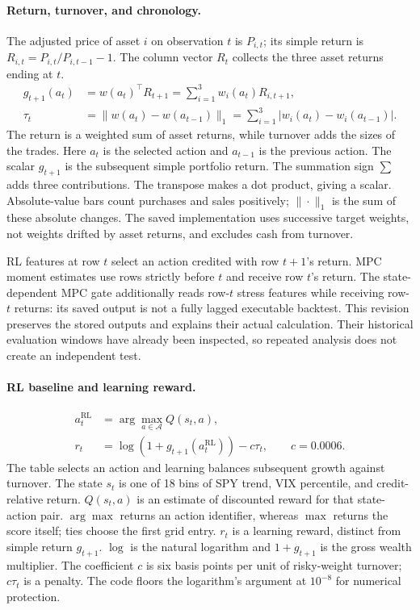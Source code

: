 \paragraph{Return, turnover, and chronology.}
The adjusted price of asset $i$ on observation $t$ is $P_{i,t}$; its simple return is $R_{i,t}=P_{i,t}/P_{i,t-1}-1$. The column vector $R_t$ collects the three asset returns ending at $t$.
\begin{equation}
\begin{aligned}
g_{t+1}(a_t)&=w(a_t)^\top R_{t+1}=\sum_{i=1}^{3}w_i(a_t)R_{i,t+1},\\
\tau_t&=\|w(a_t)-w(a_{t-1})\|_1
       =\sum_{i=1}^{3}|w_i(a_t)-w_i(a_{t-1})|.
\end{aligned}
\label{eq:return-turnover}
\end{equation}
The return is a weighted sum of asset returns, while turnover adds the sizes of the trades.
Here $a_t$ is the selected action and $a_{t-1}$ is the previous action. The scalar $g_{t+1}$ is the subsequent simple portfolio return. The summation sign $\sum$ adds three contributions. The transpose makes a dot product, giving a scalar. Absolute-value bars count purchases and sales positively; $\|\cdot\|_1$ is the sum of these absolute changes. The saved implementation uses successive target weights, not weights drifted by asset returns, and excludes cash from turnover.

RL features at row $t$ select an action credited with row $t+1$'s return. MPC moment estimates use rows strictly before $t$ and receive row $t$'s return. The state-dependent MPC gate additionally reads row-$t$ stress features while receiving row-$t$ returns: its saved output is not a fully lagged executable backtest. This revision preserves the stored outputs and explains their actual calculation. Their historical evaluation windows have already been inspected, so repeated analysis does not create an independent test.

\paragraph{RL baseline and learning reward.}
\begin{equation}
\begin{aligned}
a_t^{\mathrm{RL}}&=\arg\max_{a\in\mathcal A}Q(s_t,a),\\
r_t&=\log(1+g_{t+1}(a_t^{\mathrm{RL}}))-c\tau_t,\qquad c=0.0006.
\end{aligned}
\label{eq:rl-detailed}
\end{equation}
The table selects an action and learning balances subsequent growth against turnover.
The state $s_t$ is one of 18 bins of SPY trend, VIX percentile, and credit-relative return. $Q(s_t,a)$ is an estimate of discounted reward for that state-action pair. $\arg\max$ returns an action identifier, whereas $\max$ returns the score itself; ties choose the first grid entry. $r_t$ is a learning reward, distinct from simple return $g_{t+1}$. $\log$ is the natural logarithm and $1+g_{t+1}$ is the gross wealth multiplier. The coefficient $c$ is six basis points per unit of risky-weight turnover; $c\tau_t$ is a penalty. The code floors the logarithm's argument at $10^{-8}$ for numerical protection.


